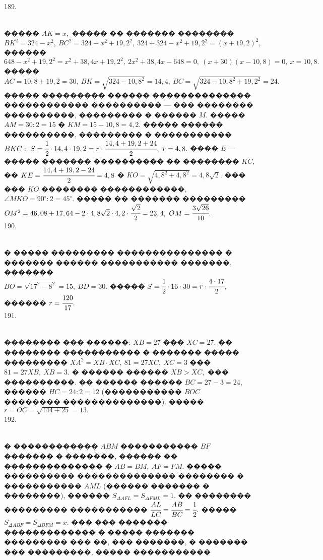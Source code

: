\documentclass[12pt]{article}
\begin{document}
189. \begin{figure}[ht!]
\end{figure}\\
����� $AK=x,$ ����� �� ������� �������� $BK^2=324-x^2,\ BC^2=324-x^2+19,2^2,\ 324+324-x^2+19,2^2=(x+19,2)^2,$ ������ $648-x^2+19,2^2=x^2+38,4x+19,2^2,\
2x^2+38,4x-648=0,\ (x+30)(x-10,8)=0,\ x=10,8.$ ����� $AC=10,8+19,2=30,\ BK=\sqrt{324-10,8^2}=14,4,\ BC=\sqrt{324-10,8^2+19,2^2}=24.$ ����� ��������� ������ �������������� ������������ ���������� --- ��� �������� ����������, ��������� � ������ $M.$ ����� $AM=30:2=15$ � $KM=15-10,8=4,2.$ ����� ������ ����������, ��������� � ����������� $BKC:\ S=\cfrac{1}{2}\cdot14,4\cdot19,2=r\cdot\cfrac{14,4+19,2+24}{2},\ r=4,8.$ ���� $E$ --- ����� ������� ���������� �� �������� $KC,$ �� $KE=\cfrac{14,4+19,2-24}{2}=4,8$ � $KO=\sqrt{4,8^2+4,8^2}=4,8\sqrt{2}.$ ��� ��� $KO$ �������� ������������, $\angle MKO=90^\circ:2=45^\circ.$ ����� �� ������� ��������� $OM^2=46,08+17,64-2\cdot4,8\sqrt{2}\cdot4,2\cdot\cfrac{\sqrt{2}}{2}=23,4,\ OM=\cfrac{3\sqrt{26}}{10}.$\\
190. \begin{figure}[ht!]
\end{figure}\\
� ����� ��������� ��������������� � ������� ������ ����������� �������, �������\\ $BO=\sqrt{17^2-8^2}=15,\ BD=30.$ ����� $S=\cfrac{1}{2}\cdot16\cdot30=r\cdot\cfrac{4\cdot17}{2},$ ������ $r=\cfrac{120}{17}.$\\
191. \begin{figure}[ht!]
\end{figure}\\
�������� ��� ������: $XB=27$ ��� $XC=27.$ �� �������� ����������� � ������� ����� ��������� $XA^2=XB\cdot XC,\ 81=27XC,\ XC=3$ ��� $81=27XB,\ XB=3.$ � ������ ������ $XB>XC,$ ��� ����������. �� ������ ������ $BC=27-3=24,$ ������ $HC=24:2=12$ (����������� $BOC$ �������� ��������������). ����� $r=OC=\sqrt{144+25}=13.$\\
192. \begin{figure}[ht!]
\end{figure}\\
� ������������ $ABM$ ����������� $BF$ ������� � �������, ������ �� �������������� � $AB=BM,\ AF=FM.$ ����� ���������� �������������� �������� � ����������� $AML$ (������ ������� � ��������), ������ $S_{\Delta AFL}=S_{\Delta FML}=1.$ �� �������� ��������� ����������� $\cfrac{AL}{LC}=\cfrac{AB}{BC}=\cfrac{1}{2}.$ ����� $S_{\Delta ABF}=S_{\Delta BFM}=x.$ ��� ��� ������� ������������� � ����� ������� ��������� ��� ��, ��� �������, � ������� ��� ���������, ����� �����������
\end{document}
